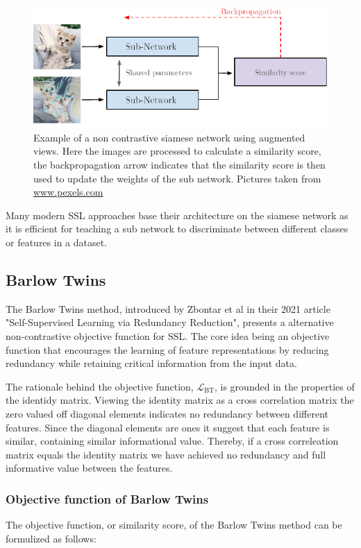 \begin{figure}[H]
    \includegraphics[scale=1]{figures/figure-pdf/Siamese.pdf}
    \caption{ Example of a non contrastive siamese network using augmented views. Here the images are processed to calculate a similarity score, the backpropagation arrow indicates that the similarity score is then used to update the weights of the sub network. Pictures taken from \url{www.pexels.com}}
    \label{fig:Siamese}
\end{figure}


Many modern SSL approaches base their architecture on the siamese network as it is efficient for teaching a sub network to discriminate between different classes or features in a dataset. 


\subsection{Barlow Twins}
The Barlow Twins method, introduced by Zbontar et al in their 2021 article "Self-Supervised Learning via Redundancy Reduction"\cite{Barlow}, presents a alternative non-contrastive objective function for SSL. The core idea being an objective function that encourages the learning of feature representations
by reducing redundancy while retaining critical information from the input data. 

The rationale behind the objective function, $\mathcal{L}_{\text{BT}}$, is grounded in the properties of the identidy matrix. Viewing the identity matrix as a cross correlation matrix the zero valued off diagonal elements indicates no redundancy between different features. Since the diagonal elements are ones it suggest that each feature is similar, containing similar informational value.
Thereby, if a cross correleation matrix equals the identity matrix we have achieved no redundancy and full informative value between the features.

\subsubsection{Objective function of Barlow Twins}
The objective function, or similarity score, of the Barlow Twins method can be formulized as follows:

